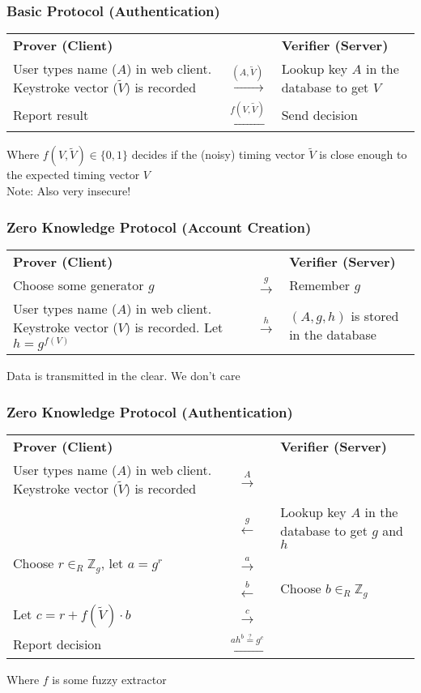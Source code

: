 \documentclass{beamer}
\begin{document}
\frame
{
  \frametitle{Basic Protocol (Authentication)}

  \begin{center}
\begin{tabular}{m{1.5in}cm{1.5in}}
\textbf{Prover (Client)} && \textbf{Verifier (Server)}\\
User types name ($A$) in web client. Keystroke vector ($\tilde V$) is recorded &$\xrightarrow{(A, \tilde V)}$ & Lookup key $A$ in the database to get $V$\\
Report result&$\xleftarrow{f(V, \tilde V)}$ & Send decision
\end{tabular}
\end{center}
\vspace{0.75in}
Where $f(V, \tilde V)\in \{0,1\}$  decides if the (noisy) timing vector $\tilde V$ is close enough to the expected timing vector $V$\\
Note: Also very insecure!

}

\frame
{
  \frametitle{Zero Knowledge Protocol (Account Creation)}

  \begin{center}
\begin{tabular}{m{1.5in}cm{1.5in}}
\textbf{Prover (Client)} && \textbf{Verifier (Server)}\\
Choose some generator $g$ & $\xrightarrow{g}$ & Remember $g$\\
User types name ($A$) in web client. Keystroke vector ($V$) is recorded. Let $h = g^{f(V)}$ &$\xrightarrow{h}$ & $(A,g,h)$ is stored in the database
\end{tabular}
\end{center}
\vspace{1in}
Data is transmitted in the clear. We don't care

}

\frame
{
  \frametitle{Zero Knowledge Protocol (Authentication)}

  \begin{center}
\begin{tabular}{m{1.5in}cm{1.5in}}
\textbf{Prover (Client)} && \textbf{Verifier (Server)}\\
User types name ($A$) in web client. Keystroke vector ($\tilde V$) is recorded &$\stackrel{A}{\longrightarrow}$ & \\
&$\stackrel{g}\longleftarrow$ & Lookup key $A$ in the database to get $g$ and $h$\\
Choose $r\in_R\mathbb{Z}_g$, let $a = g^r$ & $\stackrel{a}\longrightarrow$ & \\
& $\stackrel{b}\longleftarrow$ & Choose $b\in_R\mathbb{Z}_g$ \\
Let $c = r + f(\tilde V)\cdot b$ & $\stackrel{c}\longrightarrow$ & \\
Report decision & $\stackrel{ah^b \stackrel{?}{=} g^c}\longleftarrow$ &
\end{tabular}
\end{center}
Where $f$ is some fuzzy extractor
}
\end{document}

